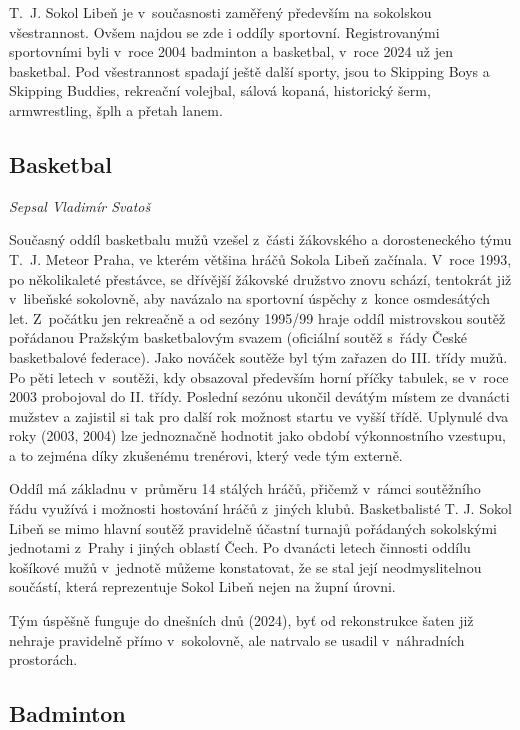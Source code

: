 \documentclass[a5paper, 11pt, twoside]{article}
\begin{document}
T.~J. Sokol Libeň je v~současnosti zaměřený především na sokolskou
všestrannost. Ovšem najdou se zde i oddíly sportovní. Registrovanými
sportovními byli v~roce 2004 badminton a basketbal, v~roce 2024 už jen
basketbal. Pod všestrannost spadají ještě další sporty, jsou to Skipping
Boys a Skipping Buddies, rekreační volejbal, sálová kopaná, historický
šerm, armwrestling, šplh a přetah lanem.

\subsection{Basketbal}

\begin{center}
  \textit{Sepsal Vladimír Svatoš}
\end{center}

\noindent
Současný oddíl basketbalu mužů vzešel z~části žákovského a
dorosteneckého týmu T.~J. Meteor Praha, ve kterém většina hráčů Sokola
Libeň začínala. V~roce 1993, po několikaleté přestávce, se dřívější
žákovské družstvo znovu schází, tentokrát již v~libeňské sokolovně, aby
navázalo na sportovní úspěchy z~konce osmdesátých let. Z~počátku jen
rekreačně a od sezóny 1995/99 hraje oddíl mistrovskou soutěž pořádanou
Pražským basketbalovým svazem (oficiální soutěž s~řády České
basketbalové federace). Jako nováček soutěže byl tým zařazen do III.
třídy mužů. Po pěti letech v~soutěži, kdy obsazoval především horní
příčky tabulek, se v~roce 2003 probojoval do II. třídy. Poslední sezónu
ukončil devátým místem ze dvanácti mužstev a zajistil si tak pro další
rok možnost startu ve vyšší třídě. Uplynulé dva roky (2003, 2004) lze
jednoznačně hodnotit jako období výkonnostního vzestupu, a to zejména
díky zkušenému trenérovi, který vede tým externě.

Oddíl má základnu v~průměru 14 stálých hráčů, přičemž v~rámci soutěžního
řádu využívá i možnosti hostování hráčů z~jiných klubů. Basketbalisté T.
J. Sokol Libeň se mimo hlavní soutěž pravidelně účastní turnajů
pořádaných sokolskými jednotami z~Prahy i jiných oblastí Čech. Po
dvanácti letech činnosti oddílu košíkové mužů v~jednotě můžeme
konstatovat, že se stal její neodmyslitelnou součástí, která
reprezentuje Sokol Libeň nejen na župní úrovni.

Tým úspěšně funguje do dnešních dnů (2024), byť od rekonstrukce šaten
již nehraje pravidelně přímo v~sokolovně, ale natrvalo se usadil
v~náhradních prostorách.

\subsection{Badminton}
\end{document}
